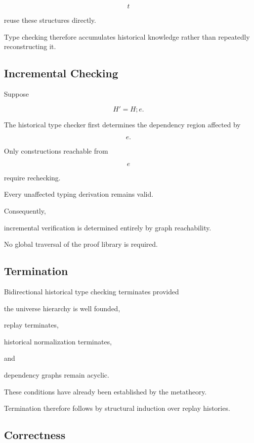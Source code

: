 \documentclass[12pt,oneside]{article}
\theoremstyle{definition}
\theoremstyle{remark}
\begin{document}
\[
t
\]

reuse these structures directly.

Type checking therefore accumulates historical knowledge rather than repeatedly
reconstructing it.


\subsection{Incremental Checking}

Suppose

\[
H'
=
H;
e.
\]

The historical type checker first determines the dependency region affected by

\[
e.
\]

Only constructions reachable from

\[
e
\]

require rechecking.

Every unaffected typing derivation remains valid.

Consequently,

incremental verification is determined entirely by graph reachability.

No global traversal of the proof library is required.


\subsection{Termination}

Bidirectional historical type checking terminates provided

the universe hierarchy is well founded,

replay terminates,

historical normalization terminates,

and

dependency graphs remain acyclic.

These conditions have already been established by the metatheory.

Termination therefore follows by structural induction over replay histories.


\subsection{Correctness}
\end{document}
